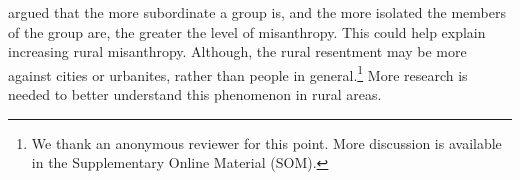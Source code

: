 \documentclass[11pt, letterpaper]{article}
\begin{document}
\begin{spacing}{1.4}

{
\citet{smith97} argued that the more subordinate a group is, and the more
isolated the members of the group are, the greater the level of misanthropy. %
 This could help explain increasing rural misanthropy.  Although, the rural resentment may be more against cities or urbanites, rather than people in general.\footnote{We thank an anonymous reviewer for this point. More discussion is available in the Supplementary Online Material (SOM).}
  More research is needed to better understand this phenomenon in rural areas. %
}


\end{spacing}
\end{document}
